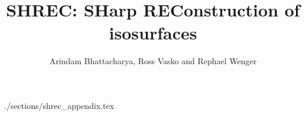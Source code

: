 \documentclass[review,journal]{vgtc}          %
\title{SHREC: SHarp REConstruction of isosurfaces}
\author{Arindam Bhattacharya, Ross Vasko and Rephael Wenger}
\begin{document}











 {./sections/shrec_appendix.tex}
\end{document}
